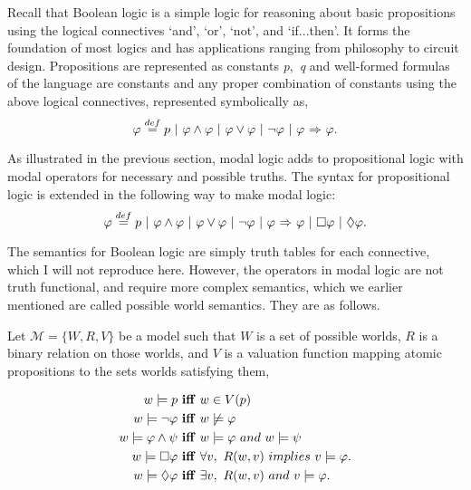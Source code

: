 Recall that Boolean logic is a simple logic for reasoning about basic propositions using the logical connectives `and', `or', `not', and `if...then'. It forms the foundation of most logics and has applications ranging from philosophy to circuit design. Propositions are represented as constants {\emph p,\ \emph q} and well-formed formulas of the language are constants and any proper combination of constants using the above logical connectives, represented symbolically as,
$$\varphi \stackrel{def}{=} p\  |\  \varphi \wedge \varphi\  |\  \varphi \vee \varphi\  |\ \neg \varphi \ |\   \varphi {\ \Rightarrow \ } \varphi. 
$$

As illustrated in the previous section, modal logic adds to propositional logic with modal operators for necessary and possible truths. The syntax for propositional logic is extended in the following way to make modal logic:
$$\varphi \stackrel{def}{=} p\  |\  \varphi \wedge \varphi\  |\  \varphi \vee \varphi\  |\ \neg \varphi \ |\   \varphi {\ \Rightarrow \ } \varphi\ |\ \Box \varphi \ |\ \Diamond \varphi. 
$$

The semantics for Boolean logic are simply truth tables for each connective, which I will not reproduce here. However, the operators in modal logic are not truth functional, and require more complex semantics, which we earlier mentioned are called possible world semantics. They are as follows.

Let $\mathcal{M} = \{W, R, V\}$ be a model such that $W$ is a set of possible worlds, $R$ is a binary relation on those worlds, and $V$ is a valuation function mapping atomic propositions to the sets worlds satisfying them,  

\begin{align*}
w \models p\  &\mathbf{iff}\ w \in V(p) \\
w \models \neg \varphi\  &\mathbf{iff}\  w\not\models \varphi  \\
w \models \varphi \wedge \psi\ &\mathbf{iff}\ w\models \varphi\ \mathnormal{and}\ w\models \psi \\
w \models \Box \varphi\  &\mathbf{iff}\ \forall v,\ R(w,v)\  \mathnormal{implies}\ v \models \varphi. \\
w \models \Diamond \varphi\ &\mathbf{iff}\ \exists v,\ R(w,v)\ \mathnormal{and}\ v\models \varphi.
\end{align*}


